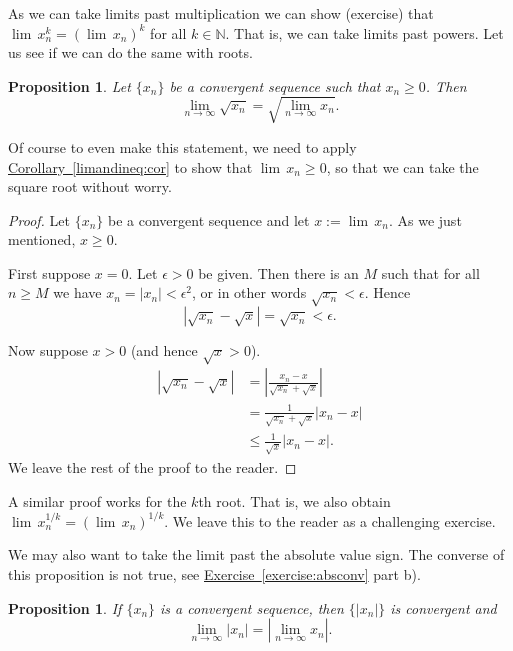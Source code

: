 \documentclass[12pt]{book}
\newcommand{\abs}[1]{\left\lvert {#1} \right\rvert}
\newcommand{\N}{{\mathbb{N}}}
\theoremstyle{plain}
\newtheorem{prop}[thm]{Proposition}
\theoremstyle{remark}
\theoremstyle{definition}
\theoremstyle{exercise}
\theoremstyle{example}
\newcommand{\exerciseref}[1]{\hyperref[#1]{Exercise~\ref*{#1}}}
\newcommand{\corref}[1]{\hyperref[#1]{Corollary~\ref*{#1}}}
\begin{document}
As we can take limits past multiplication we can show (exercise)
that $\lim\, x_n^k = {(\lim\, x_n)}^k$ for all $k \in \N$.
That is, we can take limits
past powers.  Let us see if we can do the same with roots.

\begin{prop}
Let $\{ x_n \}$ be a convergent sequence such
that $x_n \geq 0$.
Then
\begin{equation*}
\lim_{n\to\infty} \sqrt{x_n} =
\sqrt{ \lim_{n\to\infty} x_n } .
\end{equation*}
\end{prop}

Of course to even make this statement, we need to apply
\corref{limandineq:cor} to show
that
$\lim\, x_n \geq 0$, so that we can take the square root without
worry.

\begin{proof}
Let $\{ x_n \}$ be a convergent sequence and let $x := \lim\, x_n$.
As we just mentioned, $x \geq 0$.

First suppose $x=0$.  Let $\epsilon > 0$ be given.
Then there is an $M$ such that for all $n \geq M$ we have
$x_n = \abs{x_n} < \epsilon^2$, or in other words $\sqrt{x_n} < \epsilon$.
Hence
\begin{equation*}
\abs{\sqrt{x_n} - \sqrt{x}} =
\sqrt{x_n} < \epsilon.
\end{equation*}

Now suppose $x > 0$ (and hence $\sqrt{x} > 0$).
\begin{equation*}
\begin{split}
\abs{\sqrt{x_n}-\sqrt{x}} &= 
\abs{\frac{x_n-x}{\sqrt{x_n}+\sqrt{x}}} \\
&=
\frac{1}{\sqrt{x_n}+\sqrt{x}}
\abs{x_n-x} \\
& \leq
\frac{1}{\sqrt{x}}
\abs{x_n-x} .
\end{split}
\end{equation*}
We leave the rest of the proof to the reader.
\end{proof}

A similar proof works for the $k$th root.  That is, we also
obtain
$\lim\, x_n^{1/k} = {( \lim\, x_n )}^{1/k}$.  We leave this to the reader
as a challenging exercise.

We may also want to take the limit past the absolute value sign.
The converse of this proposition is not true, see
\exerciseref{exercise:absconv} part b).

\begin{prop}
If $\{ x_n \}$ is a convergent sequence, then $\{ \abs{x_n} \}$
is convergent and
\begin{equation*}
\lim_{n\to\infty} \abs{x_n} = 
\abs{\lim_{n\to\infty} x_n} .
\end{equation*}
\end{prop}
\end{document}
